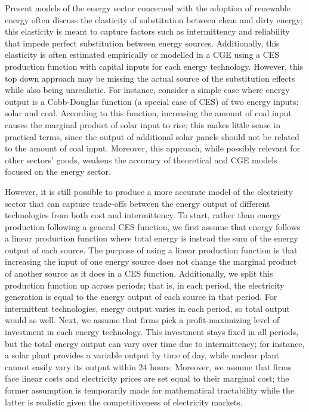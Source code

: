 \documentclass[11pt,a4paper]{extarticle}
\begin{document}
Present models of the energy sector concerned with the adoption of renewable energy often discuss the elasticity of substitution between clean and dirty energy; this elasticity is meant to capture factors such as intermittency and reliability that impede perfect substitution between energy sources. Additionally, this elasticity is often estimated empirically or modelled in a CGE using a CES production function with capital inputs for each energy technology. However, this top down approach may be missing the actual source of the substitution effects while also being unrealistic. For instance, consider a simple case where energy output is a Cobb-Douglas function (a special case of CES) of two energy inputs: solar and coal. According to this function, increasing the amount of coal input causes the marginal product of solar input to rise; this makes little sense in practical terms, since the output of additional solar panels should not be related to the amount of coal input. Moreover, this approach, while possibly relevant for other sectors' goods, weakens the accuracy of theoretical and CGE models focused on the energy sector.

However, it is still possible to produce a more accurate model of the electricity sector that can capture trade-offs between the energy output of different technologies from both cost and intermittency. To start, rather than energy production following a general CES function, we first assume that energy follows a linear production function where total energy is instead the sum of the energy output of each source. The purpose of using a linear production function is that increasing the input of one energy source does not change the marginal product of another source as it does in a CES function. Additionally, we split this production function up across periods; that is, in each period, the electricity generation is equal to the energy output of each source in that period. For intermittent technologies, energy output varies in each period, so total output would as well. Next, we assume that firms pick a profit-maximizing level of investment in each energy technology. This investment stays fixed in all periods, but the total energy output can vary over time due to intermittency; for instance, a solar plant provides a variable output by time of day, while nuclear plant cannot easily vary its output within 24 hours. Moreover, we assume that firms face linear costs and electricity prices are set equal to their marginal cost; the former assumption is temporarily made for mathematical tractability while the latter is realistic given the competitiveness of electricity markets. 
\end{document}
